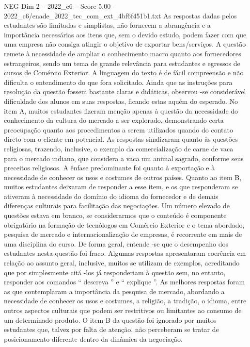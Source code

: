 \begin{textsample}{NEG Dim 2 – 2022\_c6 – Score 5.00 – 2022\_c6/enade\_2022\_tec\_com\_ext\_4bf6f451b1.txt}
As respostas dadas pelos estudantes são limitadas e simplistas, não fornecem a abrangência e a importância necessárias aos itens que, sem o devido estudo, podem fazer com que uma empresa não consiga atingir o objetivo de exportar bens/serviços.
A questão remete à necessidade de ampliar o conhecimento macro quanto aos fornecedores estrangeiros, sendo um tema de grande relevância para estudantes e egressos de cursos de Comércio Exterior.
A linguagem do texto é de fácil compreensão e não dificulta o entendimento do que fora solicitado.
Ainda que as instruções para resolução da questão fossem bastante claras e didáticas, observou -se considerável dificuldade dos alunos em suas respostas, ficando estas aquém do esperado.
No item A, muitos estudantes fizeram menção apenas à questão da necessidade do conhecimento da cultura do mercado a ser explorado, demonstrando certa preocupação quanto aos procedimentos a serem utilizados quando do contato direto com o cliente em potencial.
As respostas sinalizaram quanto às questões religiosas, trazendo, inclusive, o exemplo da comercialização de carne de vaca para o mercado indiano, que considera a vaca um animal sagrado, conforme seus preceitos religiosos.
A ênfase predominante foi quanto à exportação e à necessidade de conhecer os usos e costumes de outros países.
Quanto ao item B, muitos estudantes deixaram de responder a esse item, e os que responderam se ativeram à necessidade do domínio do idioma do fornecedor e de demais diferenças culturais para facilitação das negociações.
Um número elevado de questões estava em branco, se considerarmos que o conteúdo é componente obrigatório na formação de tecnólogos em Comércio Exterior e o tema abordado, pesquisa de mercado e internacionalização de empresas, é recorrente em mais de uma disciplina do curso.
De forma geral, entende -se que o desempenho dos estudantes nesta questão foi fraco.
Algumas respostas apresentaram coerência em relação ao assunto geral, inclusive, muitos se utilizam de exemplos, acreditando que por simplesmente citá -los já responderiam à questão sem, no entanto, responder aos comandos “ descreva ” e “ explique ”.
As melhores respostas foram as que contemplaram a importância da pesquisa de mercado, abordando a necessidade de conhecer os usos e costumes, a religião, a tradição, o idioma, entre outros aspectos culturais que podem ser restritivos ou limitantes ao consumo de um determinado produto.
O item B da questão foi ignorado por muitos estudantes que, talvez por falta de atenção, não perceberam se tratar de posicionamento diferente dentro da dinâmica da negociação.

\end{textsample}
